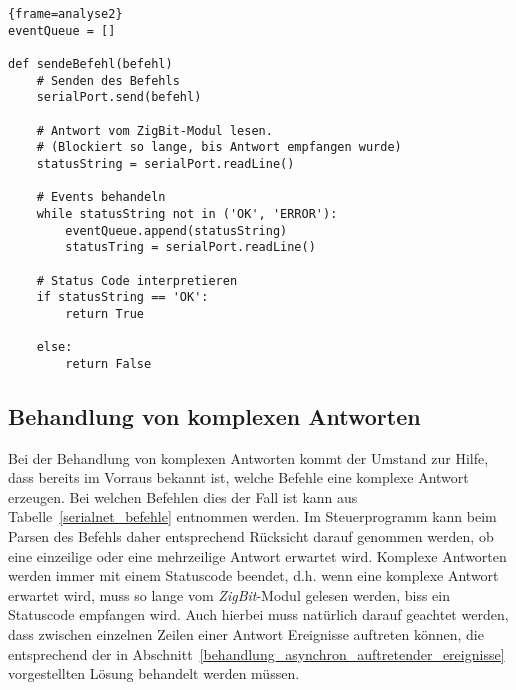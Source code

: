             \begin{lstlisting}{frame=analyse2}
eventQueue = []

def sendeBefehl(befehl)
    # Senden des Befehls
    serialPort.send(befehl)

    # Antwort vom ZigBit-Modul lesen.
    # (Blockiert so lange, bis Antwort empfangen wurde)
    statusString = serialPort.readLine()

    # Events behandeln 
    while statusString not in ('OK', 'ERROR'):
        eventQueue.append(statusString)
        statusTring = serialPort.readLine()

    # Status Code interpretieren
    if statusString == 'OK':
        return True
    
    else:
        return False
            \end{lstlisting}

        \subsection{Behandlung von komplexen Antworten}
            \label{behandlung_von_komplexen_antworten}
            Bei der Behandlung von komplexen Antworten kommt der Umstand zur Hilfe, dass bereits
            im Vorraus bekannt ist, welche Befehle eine komplexe Antwort erzeugen. Bei welchen Befehlen dies
            der Fall ist kann aus Tabelle~\ref{serialnet_befehle} entnommen werden. Im Steuerprogramm kann beim
            Parsen des Befehls daher entsprechend Rücksicht darauf genommen werden, ob eine einzeilige oder
            eine mehrzeilige Antwort erwartet wird. Komplexe Antworten werden immer mit einem Statuscode
            beendet, d.h. wenn eine komplexe Antwort erwartet wird, muss so lange vom \emph{ZigBit}-Modul
            gelesen werden, biss ein Statuscode empfangen wird. Auch hierbei muss natürlich darauf geachtet
            werden, dass zwischen einzelnen Zeilen einer Antwort Ereignisse auftreten können, die entsprechend
            der in Abschnitt~\ref{behandlung_asynchron_auftretender_ereignisse} vorgestellten Lösung behandelt 
            werden müssen.

